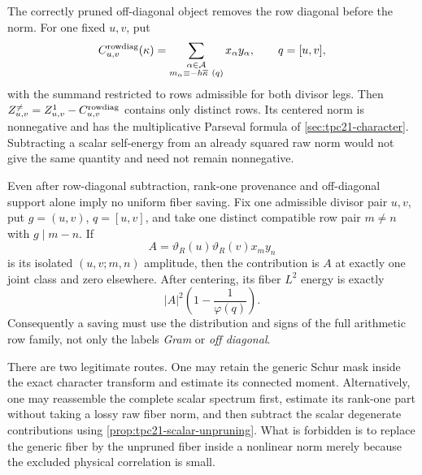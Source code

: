 The correctly pruned off-diagonal object removes the row diagonal before
the norm.
For one fixed \(u,v\), put
\begin{equation}
 C_{u,v}^{\rm rowdiag}(\kappa)
 =\sum_{\substack{\alpha\in\mathcal A\\
 m_\alpha\equiv-h\overline\kappa\ (q)}}x_\alpha y_\alpha,
 \qquad q=[u,v],
 \label{eq:tpc21-connected-diagonal-subtraction}
\end{equation}
with the summand restricted to rows admissible for both divisor legs.
Then
\(Z_{u,v}^{\ne}=Z_{u,v}^{1}-C_{u,v}^{\rm rowdiag}\)
contains only distinct rows.  Its centered norm is nonnegative and has
the multiplicative Parseval formula of
\cref{sec:tpc21-character}.  Subtracting a scalar self-energy from an
already squared raw norm would not give the same quantity and need not
remain nonnegative.

\begin{proposition}
\label{prop:tpc21-offdiagonal-spike}
Even after row-diagonal subtraction, rank-one provenance and
off-diagonal support alone imply no uniform fiber saving.  Fix one
admissible divisor pair \(u,v\), put \(g=(u,v)\), \(q=[u,v]\), and take
one distinct compatible row pair \(m\ne n\) with \(g\mid m-n\).
If
\[
 A=\vartheta_R(u)\vartheta_R(v)x_my_n
\]
is its isolated \((u,v;m,n)\) amplitude, then the contribution is
\(A\) at exactly one joint class and zero elsewhere.  After centering,
its fiber \(L^2\) energy is exactly
\begin{equation}
 |A|^2\left(1-\frac1{\varphi(q)}\right).
 \label{eq:tpc21-offdiagonal-spike-energy}
\end{equation}
Consequently a saving must use the distribution and signs of the full
arithmetic row family, not only the labels \emph{Gram} or
\emph{off diagonal}.
\end{proposition}

\begin{remark}
\label{rem:tpc21-legitimate-order}
There are two legitimate routes.  One may retain the generic Schur mask
inside the exact character transform and estimate its connected moment.
Alternatively, one may reassemble the complete scalar spectrum first,
estimate its rank-one part without taking a lossy raw fiber norm, and
then subtract the scalar degenerate contributions using
\cref{prop:tpc21-scalar-unpruning}.  What is forbidden is to replace the
generic fiber by the unpruned fiber inside a nonlinear norm merely
because the excluded physical correlation is small.
\end{remark}
